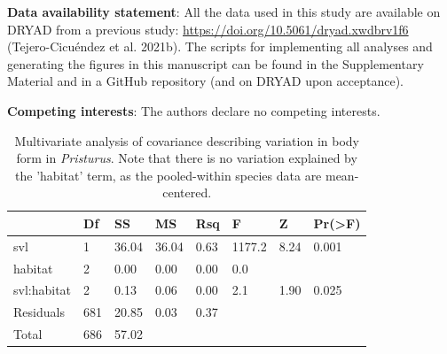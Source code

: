 \documentclass[
  11pt,
]{article}
\begin{document}
\textbf{Data availability statement}: All the data used in this study
are available on DRYAD from a previous study:
\url{https://doi.org/10.5061/dryad.xwdbrv1f6} (Tejero-Cicuéndez et al.
2021b). The scripts for implementing all analyses and generating the
figures in this manuscript can be found in the Supplementary Material
and in a GitHub repository (and on DRYAD upon acceptance).

\textbf{Competing interests}: The authors declare no competing
interests.

\newpage

\begin{table}[H]

\caption{\label{tab:unnamed-chunk-1}Multivariate analysis of covariance describing variation in body form in \textit{Pristurus}. Note that there is no variation explained by the 'habitat' term, as the pooled-within species data are mean-centered.}
\centering
\begin{tabular}[t]{llllllll}
\toprule
  & Df & SS & MS & Rsq & F & Z & Pr(>F)\\
\midrule
svl & 1 & 36.04 & 36.04 & 0.63 & 1177.2 & 8.24 & 0.001\\
habitat & 2 & 0.00 & 0.00 & 0.00 & 0.0 &  & \\
svl:habitat & 2 & 0.13 & 0.06 & 0.00 & 2.1 & 1.90 & 0.025\\
Residuals & 681 & 20.85 & 0.03 & 0.37 &  &  & \\
Total & 686 & 57.02 &  &  &  &  & \\
\bottomrule
\end{tabular}
\end{table}

\newpage
\end{document}
